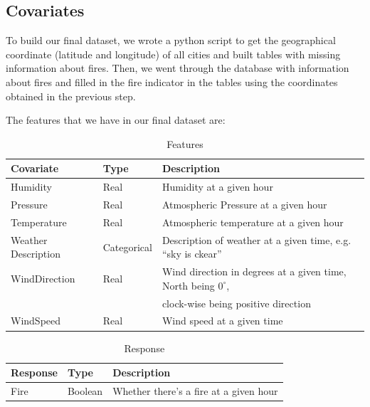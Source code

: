 \documentclass[10pt]{article}
\begin{document}
\subsection{Covariates}
To build our final dataset, we wrote a python script to get the
geographical coordinate (latitude and longitude) of all cities and built
tables with missing information about fires. Then, we went through the
database with information about fires and filled in the fire indicator
in the tables using the coordinates obtained in the previous step.\par
The features that we have in our final dataset are:
\begin{table}[H]
    \centering
    \caption{Features}
    \begin{tabular}{l|l|l}
        Covariate &Type &Description\\\hline
        Humidity &Real &Humidity at a given hour\\
        Pressure &Real &Atmospheric Pressure at a given hour\\
        Temperature &Real &Atmospheric temperature at a given hour\\
        Weather Description &Categorical &Description of weather at
        a given time, e.g. ``sky is ckear''\\
        WindDirection &Real &Wind direction in degrees at a given time,
        North being $0^\circ$,\\
        & &clock-wise being positive direction\\
        WindSpeed &Real &Wind speed at a given time\\
    \end{tabular}
\end{table}
\begin{table}[H]
    \centering
    \caption{Response}
    \begin{tabular}{l|l|l}
        Response &Type &Description\\\hline
        Fire &Boolean &Whether there's a fire at a given hour\\
    \end{tabular}
\end{table}
\end{document}
